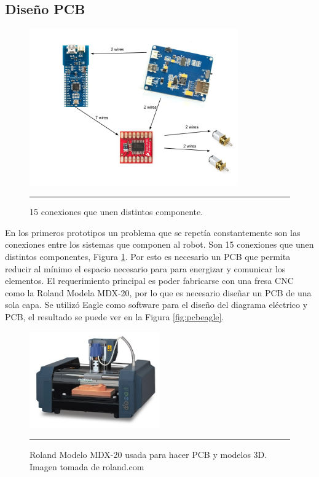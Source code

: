 \newpage

\subsection{Diseño PCB}


\begin{figure}[htbp]
	\centering
		\includegraphics[width=0.8\textwidth]{./Figures/Diagrama.jpg}
		\rule{35em}{0.5pt}
	\caption[cables]{15 conexiones que unen distintos componente.}
	\label{fig:Diagrama cables}
\end{figure}	

En los primeros prototipos un problema que se repetía constantemente son las conexiones entre los sistemas que componen al robot. Son 15 conexiones que unen distintos componentes, Figura \ref{fig:Diagrama cables}. Por esto es necesario un PCB que permita reducir al mínimo el espacio necesario para para energizar y comunicar los elementos. El requerimiento principal es poder fabricarse con una fresa CNC como la Roland Modela MDX-20, por lo que es necesario diseñar un PCB de una sola capa. Se utilizó Eagle como software para el diseño del diagrama eléctrico y PCB, el resultado se puede ver en la Figura \ref{fig:pcbeagle}.

\begin{figure}[htbp]
	\centering
		\includegraphics[width=0.5\textwidth]{./Pictures/MDX20.jpg}
		\rule{35em}{0.5pt}
	\caption[MDX20]{Roland Modelo MDX-20 usada para hacer PCB y modelos 3D. Imagen tomada de roland.com}
	\label{fig:MDX20}
\end{figure}

